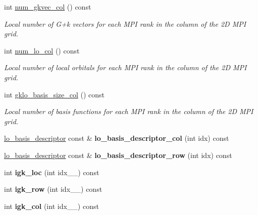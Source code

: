\begin{DoxyCompactItemize}
int \hyperlink{classsirius_1_1_k__point_a3b92c98917894c13930e04f9f7683bd2}{num\+\_\+gkvec\+\_\+col} () const 
\begin{DoxyCompactList}\small\item\em Local number of G+k vectors for each M\+P\+I rank in the column of the 2\+D M\+P\+I grid. \end{DoxyCompactList}\item 
int \hyperlink{classsirius_1_1_k__point_a6e2369b7fe0fc403890ebeb1571b007b}{num\+\_\+lo\+\_\+col} () const 
\begin{DoxyCompactList}\small\item\em Local number of local orbitals for each M\+P\+I rank in the column of the 2\+D M\+P\+I grid. \end{DoxyCompactList}\item 
int \hyperlink{classsirius_1_1_k__point_a1dbbda46f45a174bfb303c15815c6f95}{gklo\+\_\+basis\+\_\+size\+\_\+col} () const 
\begin{DoxyCompactList}\small\item\em Local number of basis functions for each M\+P\+I rank in the column of the 2\+D M\+P\+I grid. \end{DoxyCompactList}\item 
\hypertarget{classsirius_1_1_k__point_aa25c40f48b5d7482bba31592705d8fce}{}\hyperlink{structlo__basis__descriptor}{lo\+\_\+basis\+\_\+descriptor} const \& {\bfseries lo\+\_\+basis\+\_\+descriptor\+\_\+col} (int idx) const \label{classsirius_1_1_k__point_aa25c40f48b5d7482bba31592705d8fce}

\item 
\hypertarget{classsirius_1_1_k__point_aa06a919334e3bbc3817f80e6a9271117}{}\hyperlink{structlo__basis__descriptor}{lo\+\_\+basis\+\_\+descriptor} const \& {\bfseries lo\+\_\+basis\+\_\+descriptor\+\_\+row} (int idx) const \label{classsirius_1_1_k__point_aa06a919334e3bbc3817f80e6a9271117}

\item 
\hypertarget{classsirius_1_1_k__point_a2394e20f3437cae52619b4a6bd88cca6}{}int {\bfseries igk\+\_\+loc} (int idx\+\_\+\+\_\+) const \label{classsirius_1_1_k__point_a2394e20f3437cae52619b4a6bd88cca6}

\item 
\hypertarget{classsirius_1_1_k__point_a47806e23dcf0863bee9062b738a14ba2}{}int {\bfseries igk\+\_\+row} (int idx\+\_\+\+\_\+) const \label{classsirius_1_1_k__point_a47806e23dcf0863bee9062b738a14ba2}

\item 
\hypertarget{classsirius_1_1_k__point_a28ccc8ac51ffc8cc19fe1e5d2929aed8}{}int {\bfseries igk\+\_\+col} (int idx\+\_\+\+\_\+) const \label{classsirius_1_1_k__point_a28ccc8ac51ffc8cc19fe1e5d2929aed8}


\end{DoxyCompactItemize}
